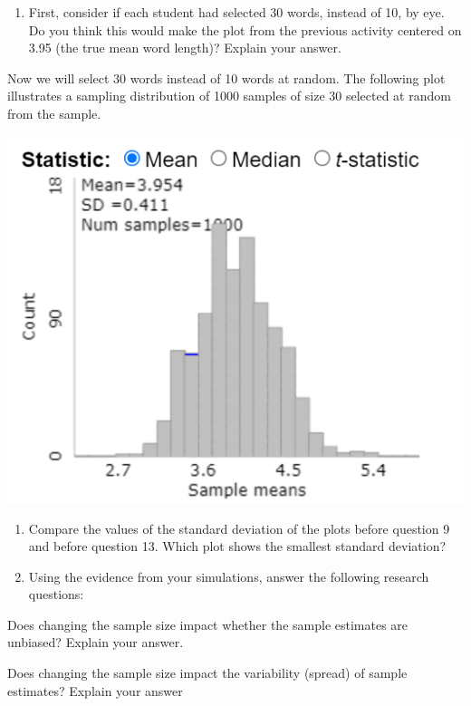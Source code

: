 \documentclass[
]{report}
\providecommand{\tightlist}{%
  \setlength{\itemsep}{0pt}\setlength{\parskip}{0pt}}
\newcommand{\rgi}{\hspace{24pt}}  %
\begin{document}
\begin{enumerate}
\def\labelenumi{\arabic{enumi}.}
\setcounter{enumi}{11}
\tightlist
\item
  First, consider if each student had selected 30 words, instead of 10, by eye. Do you think this would make the plot from the previous activity centered on 3.95 (the true mean word length)? Explain your answer.
  \vspace{0.4in}
\end{enumerate}

Now we will select 30 words instead of 10 words at random. The following plot illustrates a sampling distribution of 1000 samples of size 30 selected at random from the sample.

\begin{center}\includegraphics[width=0.75\linewidth]{images/bencenti_sampling30} \end{center}

\begin{enumerate}
\def\labelenumi{\arabic{enumi}.}
\setcounter{enumi}{12}
\item
  Compare the values of the standard deviation of the plots before question 9 and before question 13. Which plot shows the smallest standard deviation?
  \vspace{0.4in}
\item
  Using the evidence from your simulations, answer the following research questions:
\end{enumerate}

\rgi Does changing the sample size impact whether the sample estimates are unbiased? Explain your answer.
\vspace{0.5in}

\rgi Does changing the sample size impact the variability (spread) of sample estimates? Explain your answer
\vspace{0.5in}
\end{document}
